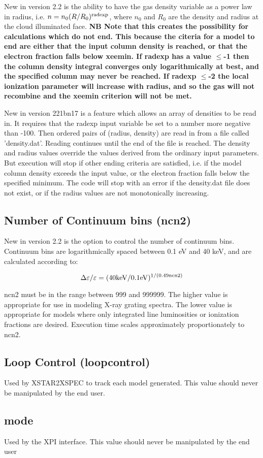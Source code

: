 New in version 2.2 is the ability to have the gas density variable as a power law in 
radius, i.e. $n=n_0(R/R_0)^{\rm radexp}$, where $n_0$ and $R_0$ are the density  and 
radius at the cloud illuminated face.  {\bf NB  Note that this creates the possibility 
for calculations which do not end.  This because the citeria for a model to end are either 
that the input column density is reached, or that the electron fraction falls below xeemin.
If radexp has a value $\leq$-1 then the column density integral converges only logarithmically 
at best, and the specified column may never be reached.  If radexp $\leq$-2 the local ionization 
parameter will increase with radius, and so the gas will not recombine and the xeemin 
criterion will not be met.}

New in version 221bn17 is a  feature which allows 
an array of densities to be read in.
It requires that the radexp input variable be set to a number more 
negative than -100.  Then ordered pairs of (radius, density) are 
read in from a file called 'density.dat'.  Reading continues
until the end of the file is reached.   The density and 
radius values override the values derived from the ordinary 
input parameters.  But execution will stop if other ending 
criteria are satisfied, i.e. if the model column density 
exceeds the input value, or the electron fraction falls below the 
specified minimum.  The code will stop with an error if the
density.dat file does not exist, or if the radius values 
are not monotonically increasing.


\subsection{Number of Continuum bins (ncn2)}  

New in version 2.2 is the option to control the number of continuum bins.  Continuum 
bins are logarithmically spaced between 0.1 eV and 40 keV, and are calculated according to:

$$\Delta\varepsilon/\varepsilon=(40 {\rm keV}/0.1 {\rm eV})^{1/(0.49 {\rm ncn2})}$$

ncn2 must be in the range between 999 and 999999.  The higher value is appropriate for use 
in modeling X-ray grating spectra.  The lower value is appropriate for models where 
only integrated line luminosities or ionization fractions are desired.  Execution time 
scales approximately proportionately to ncn2.

\subsection{Loop Control (loopcontrol)}
Used by XSTAR2XSPEC to track each model generated.  This value should 
never be manipulated by the end user.

\subsection{mode}
Used by the XPI interface.  This value should 
never be manipulated by the end user
